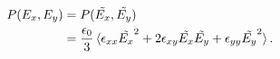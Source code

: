 \documentclass[aps, prl, twocolumn, groupedaddress]{revtex4-1}
\begin{document}
\begin{equation}
  \label{eq:pressure}
  \begin{split}
                                                                                                                                                                                                                                                                                                                                                                                                                                                                                                                                P(E_x,E_y) &= P(\tilde{E_x},\tilde{E_y})\\
                                                                                                                                                                                                                                                                                                                                                                                                                                                                                                                                &= \frac{\epsilon_0}{3}\braket{\epsilon_{xx}\tilde{E_x}^2 + 2
                                                                                                                                                                                                                                                                                                                                                                                                                                                                                                                                  \epsilon_{xy}\tilde{E_x}\tilde{E_y} +
                                                                                                                                                                                                                                                                                                                                                                                                                                                                                                                                  \epsilon_{yy}\tilde{E_y}^2} \mathrm{.}\\
  \end{split}
\end{equation}
\end{document}
